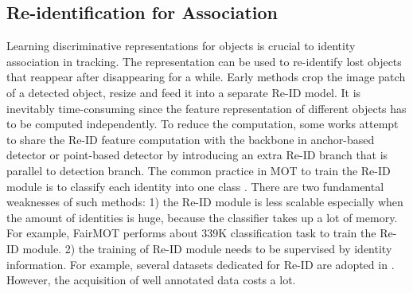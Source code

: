 \documentclass[final,1p,times,twocolumn]{elsarticle}
\begin{document}
	\subsection{Re-identification for Association}
	Learning discriminative representations for objects is crucial to identity association in tracking. The representation can be used to re-identify lost objects that reappear after disappearing for a while. Early methods \cite{wojke2017simple, bergmann2019tracking, liugsm, babaee2019dual} crop the image patch of a detected object, resize and feed it into a separate Re-ID model. It is inevitably time-consuming since the feature representation of different objects has to be computed independently. To reduce the computation, some works attempt to share the Re-ID feature computation with the backbone in anchor-based detector \cite{liu2019real, wang2019towards, voigtlaender2019mots, porzi2020learning} or point-based detector \cite{zhang2020fairmot} by introducing an extra Re-ID branch that is parallel to detection branch. The common practice in MOT to train the Re-ID module is to classify each identity into one class \cite{zhu2018online, karthik2020simple, zhang2020fairmot, wang2019towards}. There are two fundamental weaknesses of such methods: 1) the Re-ID module is less scalable especially when the amount of identities is huge, because the classifier takes up a lot of memory. For example, FairMOT \cite{zhang2020fairmot} performs about 339K classification task to train the Re-ID module. 2) the training of Re-ID module needs to be supervised by identity information. For example, several datasets dedicated for Re-ID are adopted in \cite{zhang2020fairmot, wang2019towards}. However, the acquisition of well annotated data costs a lot.
	
\end{document}
